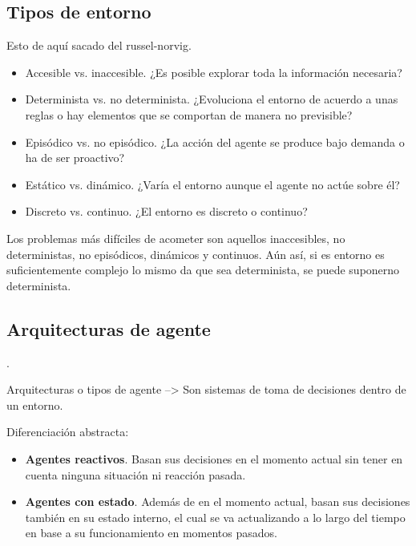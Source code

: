\subsection{Tipos de entorno}

Esto de aquí sacado del russel-norvig.

\begin{itemize}
	\item Accesible vs. inaccesible. ¿Es posible explorar toda la información necesaria?
	\item Determinista vs. no determinista. ¿Evoluciona el entorno de acuerdo a unas reglas o hay elementos que se comportan de manera no previsible?
	\item Episódico vs. no episódico. ¿La acción del agente se produce bajo demanda o ha de ser proactivo?
	\item Estático vs. dinámico. ¿Varía el entorno aunque el agente no actúe sobre él?
	\item Discreto vs. continuo. ¿El entorno es discreto o continuo?
\end{itemize}

Los problemas más difíciles de acometer son aquellos inaccesibles, no deterministas, no episódicos, dinámicos y continuos. Aún así, si es entorno es suficientemente complejo lo mismo da que sea determinista, se puede suponerno determinista.

\subsection{Arquitecturas de agente}

.

Arquitecturas o tipos de agente --> Son sistemas de toma de decisiones dentro de un entorno.

Diferenciación abstracta:

\begin{itemize}
	\item \textbf{Agentes reactivos}. Basan sus decisiones en el momento actual sin tener en cuenta ninguna situación ni reacción pasada.
	\item \textbf{Agentes con estado}. Además de en el momento actual, basan sus decisiones también en su estado interno, el cual se va actualizando a lo largo del tiempo en base a su funcionamiento en momentos pasados.
\end{itemize}

